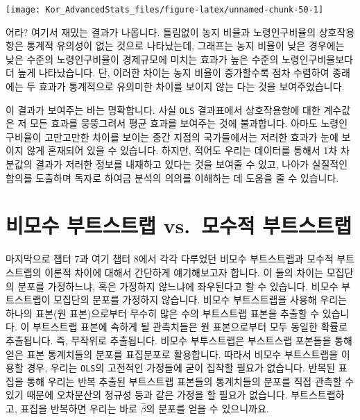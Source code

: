 \documentclass[
]{book}
\begin{document}
\begin{center}\texttt{[image: Kor\_AdvancedStats\_files/figure-latex/unnamed-chunk-50-1]} \end{center}

어라? 여기서 재밌는 결과가 나옵니다. 틀림없이 농지 비율과 노령인구비율의 상호작용항은 통계적 유의성이 없는 것으로 나타났는데, 그래프는 농지 비율이 낮은 경우에는 낮은 수준의 노령인구비율이 경제규모에 미치는 효과가 높은 수준의 노령인구비율보다 더 높게 나타났습니다. 단, 이러한 차이는 농지 비율이 증가할수록 점차 수렴하여 종래에는 두 효과가 통계적으로 유의미한 차이를 보이지 않는 다는 것을 보여주었습니다.

이 결과가 보여주는 바는 명확합니다. 사실 \texttt{OLS} 결과표에서 상호작용항에 대한 계수값은 저 모든 효과를 뭉뚱그려서 평균 효과를 보여주는 것에 불과합니다. 아마도 노령인구비율이 고만고만한 차이를 보이는 중간 지점의 국가들에서는 저러한 효과가 눈에 보이지 않게 혼재되어 있을 수 있습니다. 하지만, 적어도 우리는 데이터를 통해서 1차 차분값의 결과가 저러한 정보를 내재하고 있다는 것을 보여줄 수 있고, 나아가 실질적인 함의를 도출하며 독자로 하여금 분석의 의의를 이해하는 데 도움을 줄 수 있습니다.

\hypertarget{uxbe44uxbaa8uxc218-uxbd80uxd2b8uxc2a4uxd2b8uxb7a9-vs.-uxbaa8uxc218uxc801-uxbd80uxd2b8uxc2a4uxd2b8uxb7a9}{%
\section{비모수 부트스트랩 vs.~모수적 부트스트랩}\label{uxbe44uxbaa8uxc218-uxbd80uxd2b8uxc2a4uxd2b8uxb7a9-vs.-uxbaa8uxc218uxc801-uxbd80uxd2b8uxc2a4uxd2b8uxb7a9}}

마지막으로 챕터 7과 여기 챕터 8에서 각각 다루었던 비모수 부트스트랩과 모수적 부트스트랩의 이론적 차이에 대해서 간단하게 얘기해보고자 합니다. 이 둘의 차이는 모집단의 분포를 가정하느냐, 혹은 가정하지 않느냐에 좌우된다고 할 수 있습니다. 비모수 부트스트랩이 모집단의 분포를 가정하지 않습니다. 비모수 부트스트랩을 사용해 우리는 하나의 표본(원 표본)으로부터 무수히 많은 수의 부트스트랩 표본을 추출할 수 있습니다. 이 부트스트랩 표본에 속하게 될 관측치들은 원 표본으로부터 모두 동일한 확률로 추출됩니다. 즉, 무작위로 추출됩니다. 비모수 부투스트랩은 부스트스랩 포본들을 통해 얻은 표본 통계치들의 분포를 표집분포로 활용합니다. 따라서 비모수 부트스트랩을 이용할 경우, 우리는 \texttt{OLS}의 고전적인 가정들에 굳이 집착할 필요가 없습니다. 반복된 표집을 통해 우리는 반복 추출된 부트스트랩 표본들의 통계치들의 분포를 직접 관측할 수 있기 때문에 오차분산의 정규성 등과 같은 가정을 할 필요가 없습니다. 부트스트랩하고, 표집을 반복하면 우리는 바로 \(\hat{\beta}\)의 분포를 얻을 수 있으니까요.
\end{document}
